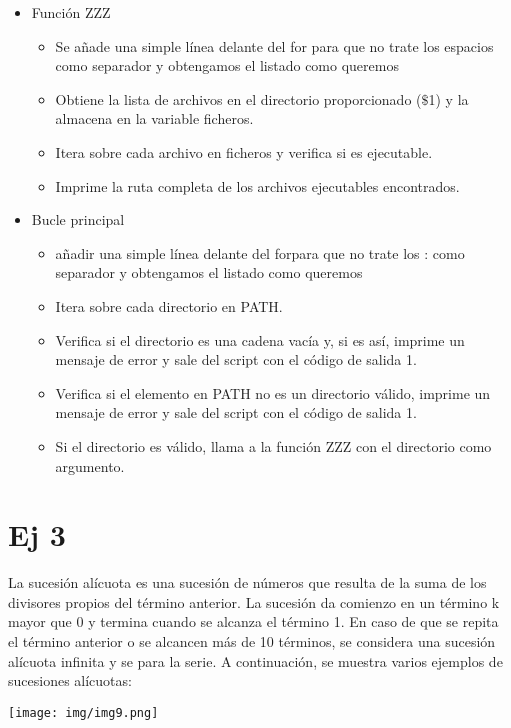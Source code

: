 \documentclass{article}
\begin{document}
\begin{itemize}
\item Función ZZZ
\begin{itemize}
\item Se añade una simple línea delante del for para que no trate los espacios como separador y obtengamos el listado como queremos
\item Obtiene la lista de archivos en el directorio proporcionado ($\$$1) y la almacena en la variable ficheros.
\item Itera sobre cada archivo en ficheros y verifica si es ejecutable.
\item Imprime la ruta completa de los archivos ejecutables encontrados.
\end{itemize}
\item Bucle principal
\begin{itemize}
\item añadir una simple línea delante del forpara que no trate los : como separador y obtengamos el listado como queremos
\item Itera sobre cada directorio en PATH.
\item Verifica si el directorio es una cadena vacía y, si es así, imprime un mensaje de error y sale del script con el código de salida 1.
\item Verifica si el elemento en PATH no es un directorio válido, imprime un mensaje de error y sale del script con el código de salida 1.
\item Si el directorio es válido, llama a la función ZZZ con el directorio como argumento.
\end{itemize}
\end{itemize}

\newpage


\section{Ej 3}
La sucesión alícuota es una sucesión de números que resulta de la suma de
los divisores propios del término anterior. La sucesión da comienzo en un
término k mayor que 0 y termina cuando se alcanza el término 1. En caso de
que se repita el término anterior o se alcancen más de 10 términos, se
considera una sucesión alícuota infinita y se para la serie. A continuación, se
muestra varios ejemplos de sucesiones alícuotas:


\begin{center}
\texttt{[image: img/img9.png]} 
\end{center}
\end{document}
